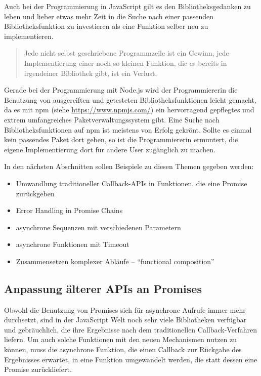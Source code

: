 \documentclass[
11pt, %
a4paper, %
oneside, %
pdfspacing, %
headinclude,
BCOR5mm, %
ngerman, %
bibtotocnumbered,
]{scrartcl}
\begin{document}
	Auch bei der Programmierung in JavaScript gilt es den Bibliotheksgedanken zu leben und lieber etwas mehr Zeit in die Suche nach einer passenden Bibliotheksfunktion zu investieren als eine Funktion selber neu zu implementieren.
	
	\begin{quote}Jede nicht selbst geschriebene Programmzeile ist ein Gewinn, jede Implementierung einer noch so kleinen Funktion, die es bereits in irgendeiner Bibliothek gibt, ist ein Verlust.~\citep[S.~333]{Steimann.2010}\end{quote}
	
	Gerade bei der Programmierung mit Node.js wird der Programmiererin die Benutzung von ausgereiften und getesteten Bibliotheksfunktionen leicht gemacht, da es mit \textsf{npm} (siehe \url{https://www.npmjs.com/}) ein hervorragend gepflegtes und extrem umfangreiches Paketverwaltungssystem gibt. Eine Suche nach Bibliotheksfunktionen auf \textsf{npm} ist meistens von Erfolg gekrönt. Sollte  es einmal kein passendes Paket dort geben, so ist die Programmiererin ermuntert, die eigene Implementierung dort für andere User zugänglich zu machen.
	
	\skippingparagraph
	In den nächsten Abschnitten sollen Beispiele zu diesen Themen gegeben werden:
	\begin{itemize}[nosep]
		\item Umwandlung traditioneller Callback-APIs in Funktionen, die eine Promise zurückgeben
		\item Error Handling in Promise Chains
		\item asynchrone Sequenzen mit verschiedenen Parametern
		\item asynchrone Funktionen mit Timeout
		\item Zusammensetzen komplexer Abläufe -- "`functional composition"'
	\end{itemize}
	
	\subsection{\label{promisify}Anpassung älterer APIs an Promises}
	
		Obwohl die Benutzung von Promises sich für asynchrone Aufrufe immer mehr durchsetzt, sind in der JavaScript Welt noch sehr viele Bibliotheken verfügbar und gebräuchlich, die ihre Ergebnisse nach dem traditionellen Callback-Verfahren liefern. Um auch solche Funktionen mit den neuen Mechanismen nutzen zu können, muss die asynchrone Funktion, die einen Callback zur Rückgabe des Ergebnisses erwartet, in eine Funktion umgewandelt werden, die statt dessen eine Promise zurückliefert.
		
\end{document}
